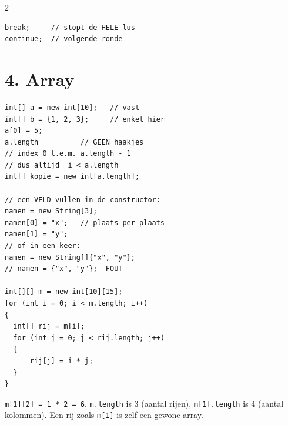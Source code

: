 \documentclass[12pt,a4paper]{extarticle}
\begin{document}
\begin{multicols}{2}
\begin{lstlisting}
break;     // stopt de HELE lus
continue;  // volgende ronde
\end{lstlisting}

    \section{4. Array}
    \begin{lstlisting}
int[] a = new int[10];   // vast
int[] b = {1, 2, 3};     // enkel hier
a[0] = 5;
a.length          // GEEN haakjes
// index 0 t.e.m. a.length - 1
// dus altijd  i < a.length
int[] kopie = new int[a.length];

// een VELD vullen in de constructor:
namen = new String[3];
namen[0] = "x";   // plaats per plaats
namen[1] = "y";
// of in een keer:
namen = new String[]{"x", "y"};
// namen = {"x", "y"};  FOUT

int[][] m = new int[10][15];
for (int i = 0; i < m.length; i++)
{
  int[] rij = m[i];
  for (int j = 0; j < rij.length; j++)
  {
      rij[j] = i * j;
  }
}
\end{lstlisting}

    \begin{center}
    \end{center}
    \vspace{-2mm}
    \texttt{m[1][2] = 1 * 2 = 6}. \quad \texttt{m.length} is 3 (aantal rijen),
    \texttt{m[1].length} is 4 (aantal kolommen). Een rij zoals \texttt{m[1]} is zelf
    een gewone array.


\end{multicols}
\end{document}
